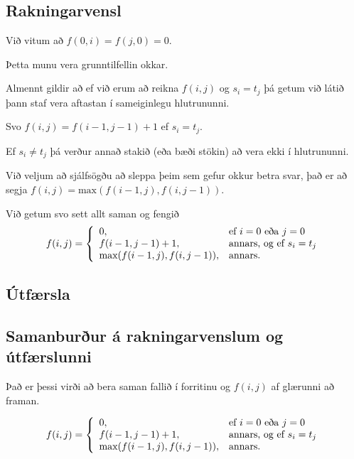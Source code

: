 \subsection{Rakningarvensl}
{
    {
        \item<1-> Við vitum að $f(0, i) = f(j, 0) = 0$.
        \item<2-> Þetta munu vera grunntilfellin okkar.
        \item<3-> Almennt gildir að ef við erum að reikna $f(i, j)$ og $s_i = t_j$ þá getum við látið þann staf vera aftastan í sameiginlegu hlutrununni.
        \item<4-> Svo $f(i, j) = f(i - 1, j - 1) + 1$ ef $s_i = t_j$.
        \item<5-> Ef $s_i \neq t_j$ þá verður annað stakið (eða bæði stökin) að vera ekki í hlutrununni.
        \item<6-> Við veljum að sjálfsögðu að sleppa þeim sem gefur okkur betra svar, það er að segja $f(i, j) = \text{max}(f(i - 1, j), f(i, j - 1))$.
        \item<7-> Við getum svo sett allt saman og fengið
        \[
            f(i, j) =
            \left \{
            \env{array}
            {
                {l l}
                0, & \text{ef $i = 0$ eða $j = 0$}\\
                f(i - 1, j - 1) + 1, & \text{annars, og ef $s_i = t_j$}\\
                \text{max}(f(i - 1, j), f(i, j - 1)), & \text{annars}.
            }
            \right .
        \]
    }
}

\subsection{Útfærsla}
{
}

\subsection{Samanburður á rakningarvenslum og útfærslunni}
{
    {
        \item<1-> Það er þessi virði að bera saman  fallið í forritinu og $f(i, j)$ af glærunni að framan.
    }
    \[
        f(i, j) =
        \left \{
        \env{array}
        {
            {l l}
            0, & \text{ef $i = 0$ eða $j = 0$}\\
            f(i - 1, j - 1) + 1, & \text{annars, og ef $s_i = t_j$}\\
            \text{max}(f(i - 1, j), f(i, j - 1)), & \text{annars}.
        }
        \right .
    \]
}

